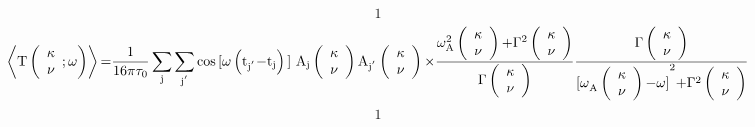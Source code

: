 \documentclass{article}
\begin{document}
\[1\] 
\[\left\langle {\rm T}\left( \begin{array}{c}
{\mathbf \kappa } \\ 
\nu  \end{array}
;\omega \right)\right\rangle {\rm =}\frac{{\rm 1}}{{\rm 16}\pi {\tau }_0}\sum_{{\rm j}}{\sum_{{{\rm j}}^{{\rm '}}}{{\cos  {\rm [}\omega \left({{\rm t}}_{{{\rm j}}^{{\rm '}}}{\rm -}{{\rm t}}_{{\rm j}}\right){\rm ]}\ }{{\rm A}}_{{\rm j}}\left( \begin{array}{c}
{\mathbf \kappa } \\ 
\nu  \end{array}
\right){{\rm A}}_{{{\rm j}}^{{\rm '}}}\left( \begin{array}{c}
{\mathbf \kappa } \\ 
\nu  \end{array}
\right){\rm \times }\frac{{\omega }^{{\rm 2}}_{{\rm A}}\left( \begin{array}{c}
{\mathbf \kappa } \\ 
\nu  \end{array}
\right){\rm +}{\Gamma }^{{\rm 2}}\left( \begin{array}{c}
{\mathbf \kappa } \\ 
\nu  \end{array}
\right)}{\Gamma \left( \begin{array}{c}
{\mathbf \kappa } \\ 
\nu  \end{array}
\right)}}\frac{\Gamma \left( \begin{array}{c}
{\mathbf \kappa } \\ 
\nu  \end{array}
\right)}{{{{\rm [}\omega }_{{\rm A}}\left( \begin{array}{c}
{\mathbf \kappa } \\ 
\nu  \end{array}
\right){\rm -}\omega {\rm ]}}^{{\rm 2}}{\rm +}{\Gamma }^{{\rm 2}}\left( \begin{array}{c}
{\mathbf \kappa } \\ 
\nu  \end{array}
\right)}}\] 
\[1\] 
\end{document}
